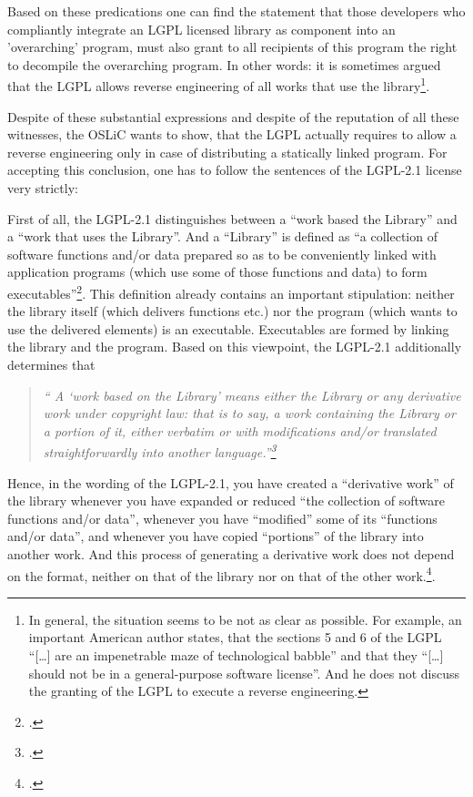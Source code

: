 Based on these predications one can find the statement that those developers who
compliantly integrate an LGPL licensed library as component into an
'overarching' program, must also grant to all recipients of this program the
right to decompile the overarching program.  In other words: it is sometimes argued
that the LGPL allows reverse engineering of all works that use the
library\footnote{In general, the situation seems to be not as clear as possible.
For example, an important American author states, that the sections 5 and 6 of
the LGPL \enquote{[\ldots] are an impenetrable maze of technological babble} and
that they \enquote{[\ldots] should not be in a general-purpose software
license}\cite[cf.][124]{Rosen2005a}. And he does not discuss the granting of
the LGPL to execute a reverse engineering.}.

Despite of these substantial expressions and despite of the reputation of all
these witnesses, the OSLiC wants to show, that the LGPL actually requires to
allow a reverse engineering only in case of distributing a statically linked
program. For accepting this conclusion, one has to follow the sentences of the
LGPL-2.1 license very strictly:

First of all, the LGPL-2.1 distinguishes between a \enquote{work based the
Library} and a \enquote{work that uses the Library}. And a \enquote{Library} is
defined as \enquote{a collection of software functions and/or data prepared so
as to be conveniently linked with application programs (which use some of those
functions and data) to form executables}\footcite[cf.][\nopage
wp §0]{Lgpl21OsiLicense1999a}. This definition already contains an important
stipulation: neither the library itself (which delivers functions etc.) nor the
program (which wants to use the delivered elements) is an executable.
Executables are formed by linking the library and the program. Based on this
viewpoint, the LGPL-2.1 additionally determines that 

\begin{quote}\emph{\enquote{
A \enquote{work based on the Library} means either the Library or any derivative
work under copyright law: that is to say, a work containing the Library or a portion
of it, either verbatim or with modifications and/or translated straightforwardly
into another language.}\footcite[cf.][\nopage wp §0]{Lgpl21OsiLicense1999a} }
\end{quote}

Hence, in the wording of the LGPL-2.1, you have created a \enquote{derivative
work} of the library whenever you have expanded or reduced \enquote{the
collection of software functions and/or data}, whenever you have
\enquote{modified} some of its \enquote{functions and/or data}, and whenever you
have copied \enquote{portions} of the library into another work. And this
process of generating a derivative work does not depend on the format, neither
on that of the library nor on that of the other work.\footcite[cf.][\nopage wp
§0]{Lgpl21OsiLicense1999a}.

